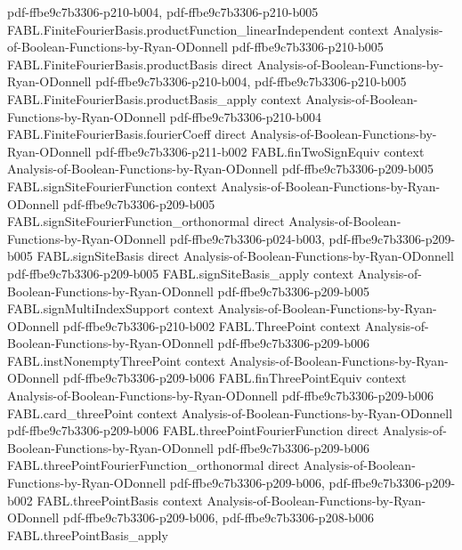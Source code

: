 \begin{theorem}
  {pdf-ffbe9c7b3306-p210-b004,
    pdf-ffbe9c7b3306-p210-b005}
\proofstep
  {FABL.FiniteFourierBasis.productFunction_linearIndependent}
  {context}
  {Analysis-of-Boolean-Functions-by-Ryan-ODonnell}
  {pdf-ffbe9c7b3306-p210-b005}
\proofstep
  {FABL.FiniteFourierBasis.productBasis}
  {direct}
  {Analysis-of-Boolean-Functions-by-Ryan-ODonnell}
  {pdf-ffbe9c7b3306-p210-b004,
    pdf-ffbe9c7b3306-p210-b005}
\proofstep
  {FABL.FiniteFourierBasis.productBasis_apply}
  {context}
  {Analysis-of-Boolean-Functions-by-Ryan-ODonnell}
  {pdf-ffbe9c7b3306-p210-b004}
\proofstep
  {FABL.FiniteFourierBasis.fourierCoeff}
  {direct}
  {Analysis-of-Boolean-Functions-by-Ryan-ODonnell}
  {pdf-ffbe9c7b3306-p211-b002}
\proofstep
  {FABL.finTwoSignEquiv}
  {context}
  {Analysis-of-Boolean-Functions-by-Ryan-ODonnell}
  {pdf-ffbe9c7b3306-p209-b005}
\proofstep
  {FABL.signSiteFourierFunction}
  {context}
  {Analysis-of-Boolean-Functions-by-Ryan-ODonnell}
  {pdf-ffbe9c7b3306-p209-b005}
\proofstep
  {FABL.signSiteFourierFunction_orthonormal}
  {direct}
  {Analysis-of-Boolean-Functions-by-Ryan-ODonnell}
  {pdf-ffbe9c7b3306-p024-b003,
    pdf-ffbe9c7b3306-p209-b005}
\proofstep
  {FABL.signSiteBasis}
  {direct}
  {Analysis-of-Boolean-Functions-by-Ryan-ODonnell}
  {pdf-ffbe9c7b3306-p209-b005}
\proofstep
  {FABL.signSiteBasis_apply}
  {context}
  {Analysis-of-Boolean-Functions-by-Ryan-ODonnell}
  {pdf-ffbe9c7b3306-p209-b005}
\proofstep
  {FABL.signMultiIndexSupport}
  {context}
  {Analysis-of-Boolean-Functions-by-Ryan-ODonnell}
  {pdf-ffbe9c7b3306-p210-b002}
\proofstep
  {FABL.ThreePoint}
  {context}
  {Analysis-of-Boolean-Functions-by-Ryan-ODonnell}
  {pdf-ffbe9c7b3306-p209-b006}
\proofstep
  {FABL.instNonemptyThreePoint}
  {context}
  {Analysis-of-Boolean-Functions-by-Ryan-ODonnell}
  {pdf-ffbe9c7b3306-p209-b006}
\proofstep
  {FABL.finThreePointEquiv}
  {context}
  {Analysis-of-Boolean-Functions-by-Ryan-ODonnell}
  {pdf-ffbe9c7b3306-p209-b006}
\proofstep
  {FABL.card_threePoint}
  {context}
  {Analysis-of-Boolean-Functions-by-Ryan-ODonnell}
  {pdf-ffbe9c7b3306-p209-b006}
\proofstep
  {FABL.threePointFourierFunction}
  {direct}
  {Analysis-of-Boolean-Functions-by-Ryan-ODonnell}
  {pdf-ffbe9c7b3306-p209-b006}
\proofstep
  {FABL.threePointFourierFunction_orthonormal}
  {direct}
  {Analysis-of-Boolean-Functions-by-Ryan-ODonnell}
  {pdf-ffbe9c7b3306-p209-b006,
    pdf-ffbe9c7b3306-p209-b002}
\proofstep
  {FABL.threePointBasis}
  {context}
  {Analysis-of-Boolean-Functions-by-Ryan-ODonnell}
  {pdf-ffbe9c7b3306-p209-b006,
    pdf-ffbe9c7b3306-p208-b006}
\proofstep
  {FABL.threePointBasis_apply}

\end{theorem}
